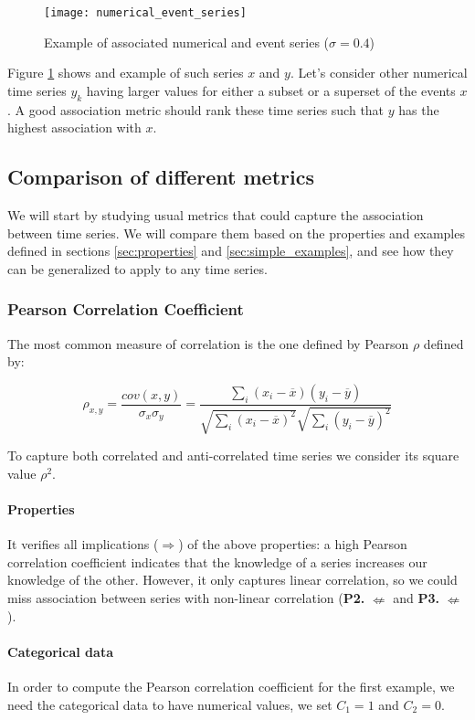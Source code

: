 \documentclass[12pt,a4paper]{article}
\begin{document}
\begin{figure}[h]
\centering
\texttt{[image: numerical\_event\_series]}
\caption{Example of associated numerical and event series ($\sigma = 0.4$)}
\label{fig:numerical_event_series}
\end{figure}

Figure \ref{fig:numerical_event_series} shows and example of such series $x$ and $y$. 
Let's consider other numerical time series $y_k$ having larger values for either a subset or a superset of the events $x$. A good association metric should rank these time series such that $y$ has the highest association with $x$.


\subsection{Comparison of different metrics}

We will start by studying usual metrics that could capture the association between time series. We will compare them based on the properties and examples defined in sections \ref{sec:properties} and \ref{sec:simple_examples}, and see how they can be generalized to apply to any time series.

\subsubsection{Pearson Correlation Coefficient}
The most common measure of correlation is the one defined by Pearson $\rho$ defined by:

$$
\rho_{x,y} = \frac{cov(x, y)}{\sigma_x \sigma_y} =  \dfrac{\sum_i (x_i - \overline{x}) (y_i - \overline{y})}{\sqrt{\sum_i (x_i - \overline{x})^2} \sqrt{\sum_i (y_i - \overline{y})^2}}
$$

To capture both correlated and anti-correlated time series we consider its square value $\rho^2$. 

\paragraph{Properties}
It verifies all implications ($\Rightarrow$) of the above properties: a high Pearson correlation coefficient indicates that the knowledge of a series increases our knowledge of the other. However, it only captures linear correlation, so we could miss association between series with non-linear correlation (\textbf{P2.} $\nLeftarrow$ and \textbf{P3.} $\nLeftarrow$). 

\paragraph{Categorical data}
In order to compute the Pearson correlation coefficient for the first example, we need the categorical data to have numerical values, we set $C_1 = 1$ and $C_2 = 0$.
\end{document}
